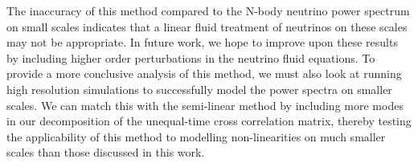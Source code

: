 \documentclass{aastex}
\begin{document}
The inaccuracy of this method compared to the
N-body neutrino power spectrum on small scales 
indicates that a linear
fluid treatment of neutrinos on these scales may not be appropriate.
In future work, we hope to improve upon these results by
including higher order perturbations in the neutrino fluid equations.
To provide a more conclusive
analysis of this method, we must also look at
running high resolution simulations to successfully model the
power spectra on smaller scales.  We can match this with the
semi-linear method by including more modes in our decomposition of the
unequal-time cross correlation matrix, thereby testing the applicability of
this method to modelling non-linearities on much smaller scales than
those 
discussed in this work. 
\end{document}
